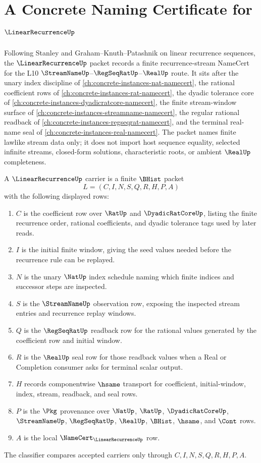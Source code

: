 \chapter{A Concrete Naming Certificate for $\LinearRecurrenceUp$}
\label{ch:concrete-instances-linear-recurrence-namecert}

Following Stanley and Graham--Knuth--Patashnik on linear recurrence sequences, the $\LinearRecurrenceUp$ packet records a finite recurrence-stream NameCert for the L10 $\StreamNameUp$--$\RegSeqRatUp$--$\RealUp$ route. It sits after the unary index discipline of \autoref{ch:concrete-instances-nat-namecert}, the rational coefficient rows of \autoref{ch:concrete-instances-rat-namecert}, the dyadic tolerance core of \autoref{ch:concrete-instances-dyadicratcore-namecert}, the finite stream-window surface of \autoref{ch:concrete-instances-streamname-namecert}, the regular rational readback of \autoref{ch:concrete-instances-regseqrat-namecert}, and the terminal real-name seal of \autoref{ch:concrete-instances-real-namecert}. The packet names finite lawlike stream data only; it does not import host sequence equality, selected infinite streams, closed-form solutions, characteristic roots, or ambient $\RealUp$ completeness.

\begin{definition}
\label{def:linear-recurrence-carrier}
A $\LinearRecurrenceUp$ carrier is a finite $\BHist$ packet
$$
L=(C,I,N,S,Q,R,H,P,A)
$$
with the following displayed rows:
\begin{enumerate}
\item $C$ is the coefficient row over $\RatUp$ and $\DyadicRatCoreUp$, listing the finite recurrence order, rational coefficients, and dyadic tolerance tags used by later reads.
\item $I$ is the initial finite window, giving the seed values needed before the recurrence rule can be replayed.
\item $N$ is the unary $\NatUp$ index schedule naming which finite indices and successor steps are inspected.
\item $S$ is the $\StreamNameUp$ observation row, exposing the inspected stream entries and recurrence replay windows.
\item $Q$ is the $\RegSeqRatUp$ readback row for the rational values generated by the coefficient row and initial window.
\item $R$ is the $\RealUp$ seal row for those readback values when a Real or Completion consumer asks for terminal scalar output.
\item $H$ records componentwise $\hsame$ transport for coefficient, initial-window, index, stream, readback, and seal rows.
\item $P$ is the $\Pkg$ provenance over $\NatUp$, $\RatUp$, $\DyadicRatCoreUp$, $\StreamNameUp$, $\RegSeqRatUp$, $\RealUp$, $\BHist$, $\hsame$, and $\Cont$ rows.
\item $A$ is the local $\NameCert_{\LinearRecurrenceUp}$ row.
\end{enumerate}
The classifier compares accepted carriers only through $C,I,N,S,Q,R,H,P,A$.
\end{definition}

